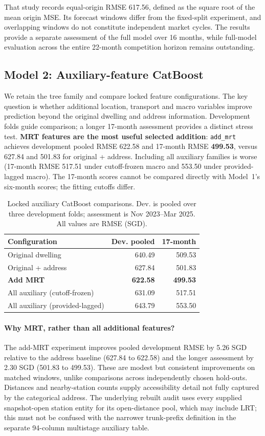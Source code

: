 \documentclass[10pt,a4paper]{article}
\begin{document}
That study records equal-origin RMSE 617.56, defined as the
square root of the mean origin MSE.
Its forecast windows differ from the fixed-split experiment,
and overlapping windows do not constitute independent market
cycles.
The results provide a separate assessment of the full model
over 16 months, while full-model evaluation across the entire
22-month competition horizon remains outstanding.

\subsection{Model 2: Auxiliary-feature CatBoost}\label{sec:m2}
We retain the tree family and compare locked feature configurations. The key question is whether additional location, transport and macro variables improve prediction beyond the original dwelling and address information. Development folds guide comparison; a longer 17-month assessment provides a distinct stress test. \textbf{MRT features are the most useful selected addition}: \texttt{add\_mrt} achieves development pooled RMSE 622.58 and 17-month RMSE \textbf{499.53}, versus 627.84 and 501.83 for original + address. Including all auxiliary families is worse (17-month RMSE 517.51 under cutoff-frozen macro and 553.50 under provided-lagged macro). The 17-month scores cannot be compared directly with Model~1's six-month scores; the fitting cutoffs differ.
\begin{table}[htbp]\centering\small
\caption{Locked auxiliary CatBoost comparisons. Dev. is pooled over three development folds; assessment is Nov 2023--Mar 2025. All values are RMSE (SGD).}\label{tab:auxmain}
\begin{tabular}{lrr}\toprule Configuration & Dev. pooled & 17-month\\\midrule
Original dwelling & 640.49 & 509.53\\
Original + address & 627.84 & 501.83\\
\textbf{Add MRT} & \textbf{622.58} & \textbf{499.53}\\
All auxiliary (cutoff-frozen) & 631.09 & 517.51\\
All auxiliary (provided-lagged) & 643.79 & 553.50\\\bottomrule\end{tabular}\end{table}


\paragraph{Why MRT, rather than all additional features?}
The add-MRT experiment improves pooled development RMSE by 5.26 SGD relative to the address baseline (627.84 to 622.58) and the longer assessment by 2.30 SGD (501.83 to 499.53). These are modest but consistent improvements on matched windows, unlike comparisons across independently chosen hold-outs. Distances and nearby-station counts supply accessibility detail not fully captured by the categorical address. The underlying rebuilt audit uses every supplied snapshot-open station entity for its open-distance pool, which may include LRT; this must not be confused with the narrower trunk-prefix definition in the separate 94-column multistage auxiliary table.
\end{document}

